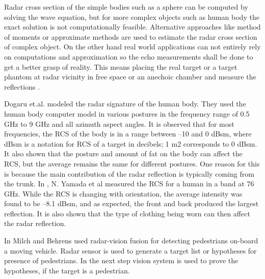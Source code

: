 Radar cross section of the simple bodies such as a sphere can be computed by solving the wave equation, but for more complex objects such as human body the exact solution is not computationally feasible. Alternative approaches like method of moments or approximate methods are used to estimate the radar cross section of complex object. On the other hand real world applications can not entirely rely on computations and approximation so the echo measurements shall be done to get a better grasp of reality. This means placing the real target or a target phantom at radar vicinity in free space or an anechoic chamber and measure the reflections \cite{skolnik2008radar}. 

Dogaru et.al. \cite{Dogaru2007} modeled the radar signature of the human body. They used the human body computer model in various postures in the frequency range of 0.5 GHz to 9 GHz and all azimuth aspect angles. It is observed that for most frequencies, the RCS of the body is in a range between –10 and 0 dBsm, where dBsm is a notation for RCS of a target in decibels; 1 m2 corresponds to 0 dBsm. It also shown that the posture and amount of fat on the body can affect the RCS, but the average remains the same for different postures. One reason for this is because the main contribution of the radar reflection is typically coming from the trunk.
\newline
In \cite{Yamada2005}, N. Yamada et al measured the RCS for a human in a band at 76 GHz. While the RCS is changing with orientation, the average intensity was found to be –8.1 dBsm, and as expected, the front and back produced the largest reflection. It is also shown that the type of clothing being worn can then affect the radar reflection.


In\cite{RadarVisionfusion} Milch and Behrens used radar-vision fusion for detecting pedestrians on-board a moving vehicle. Radar sensor is used to generate a target list or hypotheses for presence of pedestrians. In the next step vision system is used to prove the hypotheses, if the target is a pedestrian.